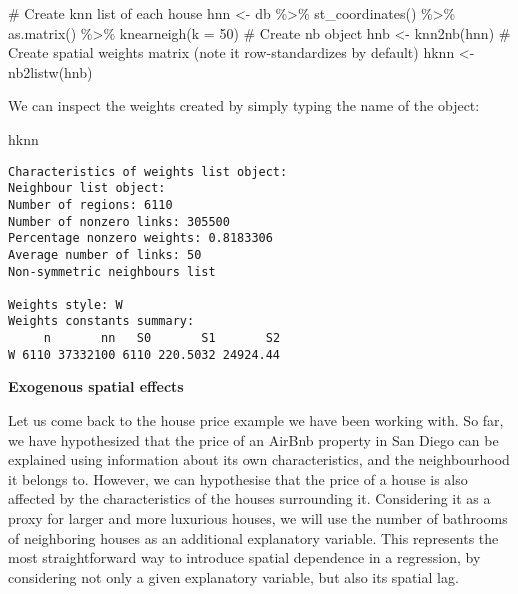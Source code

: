 \documentclass[
  letterpaper,
  krantz2]{style/krantz}
\newenvironment{Shaded}{\begin{snugshade}}{\end{snugshade}}
\newcommand{\AttributeTok}[1]{\textcolor[rgb]{0.40,0.45,0.13}{#1}}
\newcommand{\CommentTok}[1]{\textcolor[rgb]{0.37,0.37,0.37}{#1}}
\newcommand{\DecValTok}[1]{\textcolor[rgb]{0.68,0.00,0.00}{#1}}
\newcommand{\FunctionTok}[1]{\textcolor[rgb]{0.28,0.35,0.67}{#1}}
\newcommand{\NormalTok}[1]{\textcolor[rgb]{0.00,0.23,0.31}{#1}}
\newcommand{\OtherTok}[1]{\textcolor[rgb]{0.00,0.23,0.31}{#1}}
\newcommand{\SpecialCharTok}[1]{\textcolor[rgb]{0.37,0.37,0.37}{#1}}
\begin{document}
\begin{Shaded}
\begin{Highlighting}[]
\CommentTok{\# Create knn list of each house}
\NormalTok{hnn }\OtherTok{\textless{}{-}}\NormalTok{ db }\SpecialCharTok{\%\textgreater{}\%}
  \FunctionTok{st\_coordinates}\NormalTok{() }\SpecialCharTok{\%\textgreater{}\%}
  \FunctionTok{as.matrix}\NormalTok{() }\SpecialCharTok{\%\textgreater{}\%}
  \FunctionTok{knearneigh}\NormalTok{(}\AttributeTok{k =} \DecValTok{50}\NormalTok{)}
\CommentTok{\# Create nb object}
\NormalTok{hnb }\OtherTok{\textless{}{-}} \FunctionTok{knn2nb}\NormalTok{(hnn)}
\CommentTok{\# Create spatial weights matrix (note it row{-}standardizes by default)}
\NormalTok{hknn }\OtherTok{\textless{}{-}} \FunctionTok{nb2listw}\NormalTok{(hnb)}
\end{Highlighting}
\end{Shaded}

We can inspect the weights created by simply typing the name of the
object:

\begin{Shaded}
\begin{Highlighting}[]
\NormalTok{hknn}
\end{Highlighting}
\end{Shaded}

\begin{verbatim}
Characteristics of weights list object:
Neighbour list object:
Number of regions: 6110 
Number of nonzero links: 305500 
Percentage nonzero weights: 0.8183306 
Average number of links: 50 
Non-symmetric neighbours list

Weights style: W 
Weights constants summary:
     n       nn   S0       S1       S2
W 6110 37332100 6110 220.5032 24924.44
\end{verbatim}

\textbf{Exogenous spatial effects}

Let us come back to the house price example we have been working with.
So far, we have hypothesized that the price of an AirBnb property in San
Diego can be explained using information about its own characteristics,
and the neighbourhood it belongs to. However, we can hypothesise that
the price of a house is also affected by the characteristics of the
houses surrounding it. Considering it as a proxy for larger and more
luxurious houses, we will use the number of bathrooms of neighboring
houses as an additional explanatory variable. This represents the most
straightforward way to introduce spatial dependence in a regression, by
considering not only a given explanatory variable, but also its spatial
lag.
\end{document}
